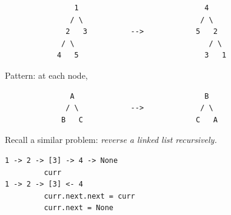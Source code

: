 \documentclass[11pt]{article}
\begin{document}
\begin{verbatim}
                1                             4
               / \                           / \
              2   3          -->            5   2
             / \                               / \
            4   5                             3   1
\end{verbatim}

Pattern: at each node,

\begin{verbatim}
               A                              B
              / \            -->             / \
             B   C                          C   A
\end{verbatim}

Recall a similar problem: \emph{reverse a linked list recursively.}

\begin{verbatim}
1 -> 2 -> [3] -> 4 -> None
         curr
1 -> 2 -> [3] <- 4
         curr.next.next = curr
         curr.next = None
\end{verbatim}
\end{document}
